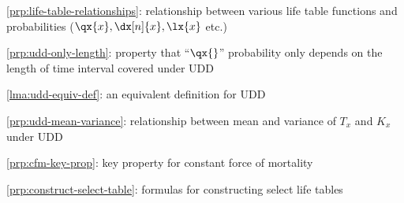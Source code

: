 \item \cref{prp:life-table-relationships}: relationship between various life table functions and probabilities (\(\qx{x},\dx[n]{x},\lx{x}\) etc.)
\item \cref{prp:udd-only-length}: property that ``\(\qx{}\)'' probability only
depends on the length of time interval covered under UDD
\item \cref{lma:udd-equiv-def}: an equivalent definition for UDD
\item \cref{prp:udd-mean-variance}: relationship between mean and variance of \(T_x\) and \(K_x\) under UDD
\item \cref{prp:cfm-key-prop}: key property for constant force of mortality
\item \cref{prp:construct-select-table}: formulas for constructing select life tables
